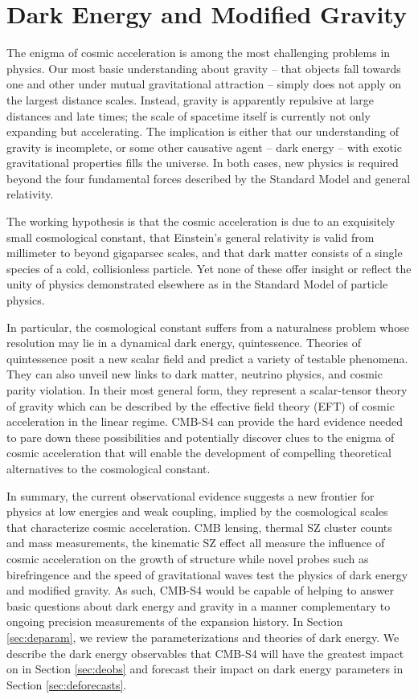 \section{Dark Energy and Modified Gravity}


The enigma of cosmic acceleration is among the most challenging problems in physics. Our most basic understanding about gravity -- that objects fall towards one and other under mutual gravitational attraction -- simply does not apply on the largest distance scales. Instead, gravity is apparently repulsive at large distances and late times; the scale of spacetime itself is currently not only expanding but accelerating. The implication is either that our understanding of gravity is incomplete, or some other causative agent -- dark energy -- with exotic gravitational properties fills the universe. In both cases, new physics is required beyond the four fundamental forces described by the Standard Model and general relativity.

The working hypothesis is that the cosmic acceleration is due to an exquisitely small cosmological constant, that Einstein's general relativity is valid from millimeter to beyond gigaparsec scales, and that dark matter consists of a single species of a cold, collisionless particle. Yet none of these offer insight or reflect the unity of physics demonstrated elsewhere as in the Standard Model of particle physics.

In particular, the cosmological constant suffers from a naturalness problem whose resolution may lie in a dynamical dark energy, quintessence. Theories of quintessence posit a new scalar field and predict a variety of testable phenomena.  They can also unveil new links to dark matter, neutrino physics, and cosmic parity violation. In their most general form, they represent
a scalar-tensor theory of gravity which can be described by  the effective field theory (EFT) of cosmic acceleration in the linear regime. 
CMB-S4 can provide the hard evidence  needed to pare down these possibilities and potentially discover clues to the enigma of cosmic acceleration that will enable the development of  compelling theoretical 
alternatives to the cosmological constant.

In summary, the current observational evidence suggests a new frontier for physics at low energies and weak coupling, implied by the cosmological scales that characterize cosmic acceleration.  CMB lensing, thermal SZ cluster counts and mass measurements,  the kinematic SZ effect  all measure the influence of cosmic acceleration on the growth of 
structure while novel probes such as birefringence and the speed of gravitational waves test the physics of dark energy and modified gravity.   As such, CMB-S4 would be capable of helping to answer basic questions about dark energy and gravity in a manner complementary to ongoing precision measurements of the expansion history.    In Section \ref{sec:deparam}, we review the parameterizations and theories of dark energy.  We describe the 
dark energy observables that CMB-S4 will have the greatest impact on in Section \ref{sec:deobs} and forecast their impact on dark energy 
parameters in Section \ref{sec:deforecasts}.

